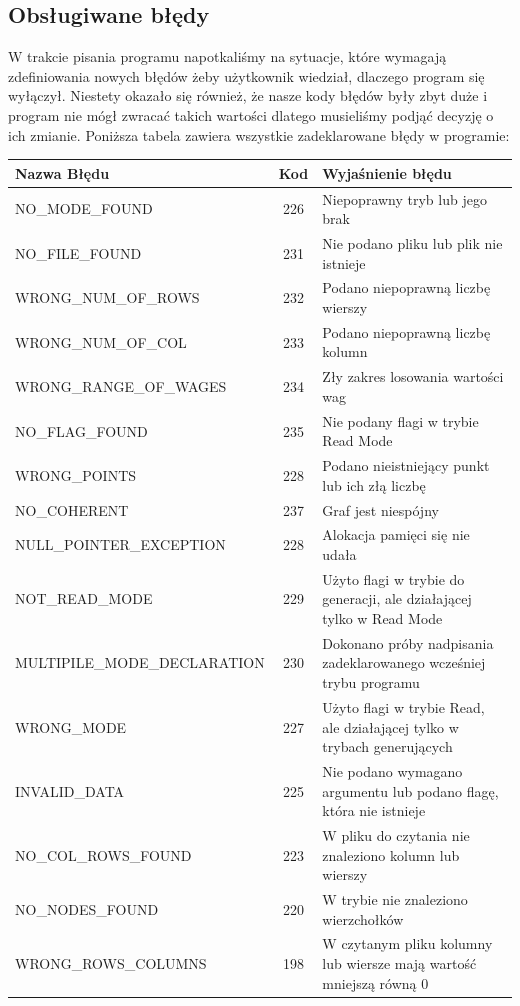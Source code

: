 \documentclass[10pt, a4paper]{report}
\begin{document}
    \subsection{Obsługiwane błędy}
    W trakcie pisania programu napotkaliśmy na sytuacje, które wymagają zdefiniowania nowych błędów żeby użytkownik wiedział, dlaczego program się wyłączył.
    Niestety okazało się również, że nasze kody błędów były zbyt duże i program nie mógł zwracać takich wartości dlatego musieliśmy podjąć decyzję o ich zmianie.
    \newline Poniższa tabela zawiera wszystkie zadeklarowane błędy w programie:
    \newline
    \begin{tabularx}{\textwidth}{ l|c|X } 
        \hline Nazwa Błędu & Kod & Wyjaśnienie błędu\\ 
        \hline NO\_MODE\_FOUND & 226 & Niepoprawny tryb lub jego brak\\ 
        \hline NO\_FILE\_FOUND & 231 & Nie podano pliku lub plik nie istnieje\\ 
        \hline WRONG\_NUM\_OF\_ROWS & 232 & Podano niepoprawną liczbę wierszy\\
        \hline WRONG\_NUM\_OF\_COL & 233 & Podano niepoprawną liczbę kolumn\\
        \hline WRONG\_RANGE\_OF\_WAGES & 234 & Zły zakres losowania wartości wag\\
        \hline NO\_FLAG\_FOUND & 235 & Nie podany flagi w trybie Read Mode\\
        \hline WRONG\_POINTS & 228 & Podano nieistniejący punkt lub ich złą liczbę\\
        \hline NO\_COHERENT & 237 & Graf jest niespójny \\
        \hline NULL\_POINTER\_EXCEPTION & 228 & Alokacja pamięci się nie udała\\
        \hline NOT\_READ\_MODE & 229 & Użyto flagi w trybie do generacji, ale działającej tylko w Read Mode\\
        \hline MULTIPILE\_MODE\_DECLARATION & 230 & Dokonano próby nadpisania zadeklarowanego wcześniej trybu programu\\
        \hline WRONG\_MODE & 227 & Użyto flagi w trybie Read, ale działającej tylko w trybach generujących\\
        \hline INVALID\_DATA & 225 & Nie podano wymagano argumentu lub podano flagę, która nie istnieje\\
        \hline NO\_COL\_ROWS\_FOUND & 223 & W pliku do czytania nie znaleziono kolumn lub wierszy\\
        \hline NO\_NODES\_FOUND & 220 & W trybie nie znaleziono wierzchołków\\
        \hline WRONG\_ROWS\_COLUMNS & 198 & W czytanym pliku kolumny lub wiersze mają wartość mniejszą równą 0\\
        \hline
    \end{tabularx}
\end{document}
